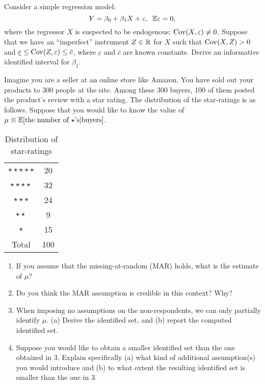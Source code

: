 \documentclass[11pt, A4paper, openany, uplatex]{book}
\begin{document}
\hrulefill
\begin{exercise}\upshape
	Consider a simple regression model:
	\[
	Y = \beta_0 + \beta_1 X + \varepsilon, \;\; \mathbb{E} \varepsilon = 0,
	\]
	where the regressor $X$ is suspected to be endogenous: $\mathrm{Cov}(X, \varepsilon) \neq 0$.
	Suppose that we have an ``imperfect'' instrument $Z \in \mathbb{R}$ for $X$ such that $\mathrm{Cov}(X, Z) > 0$ and $\underbar c \le \mathrm{Cov}(Z,\varepsilon) \le \overline c$, where $\underbar c$ and $\bar c$ are known constants.
	Derive an informative identified interval for $\beta_1$.
\end{exercise}

\begin{exercise}\upshape
Imagine you are a seller at an online store like Amazon.
You have sold out your products to 300 people at the site.
Among these 300 buyers, 100 of them posted the product's review with a star rating.
The distribution of the star-ratings is as follows.
Suppose that you would like to know the value of $\mu \equiv \mathbb{E}[\text{the number of $\star$'s}|\text{buyers}]$.

\begin{table}[h]
	\caption{Distribution of star-ratings}
	\begin{center}
	\begin{tabular}{c|c}
	\hline
	$\star \star \star \star \star $ & 20 \\
	$\star \star \star \star $ & 32 \\
	$\star \star \star $ & 24 \\
	$\star \star $ & 9 \\
	$\star $ & 15 \\
	\hline
	Total & 100\\
	\hline
	\end{tabular}
	\end{center}
\end{table}

\begin{enumerate}
	\item If you assume that the missing-at-random (MAR) holds, what is the estimate of $\mu$?
	\item Do you think the MAR assumption is credible in this context? Why?
	\item When imposing no assumptions on the non-respondents, we can only partially identify $\mu$.
	(a) Derive the identified set, and (b) report the computed identified set.
	\item Suppose you would like to obtain a smaller identified set than the one obtained in 3.
	Explain specifically (a) what kind of additional assumption(s) you would introduce and (b) to what extent the resulting identified set is smaller than the one in 3. 
\end{enumerate}
\end{exercise}
\end{document}
